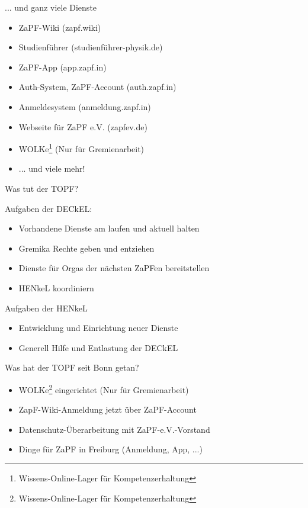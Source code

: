 \documentclass[compress, aspectratio=169]{beamer}
\begin{document}
\thispagestyle{empty}
\begin{frame}{... und ganz viele Dienste}
  \begin{itemize}
    \item ZaPF-Wiki (zapf.wiki)
    \item Studienführer (studienführer-physik.de)
    \item ZaPF-App (app.zapf.in)
    \item Auth-System, \glqq{}ZaPF-Account\grqq{} (auth.zapf.in)
    \item Anmeldesystem (anmeldung.zapf.in)
    \item Webseite für ZaPF e.V. (zapfev.de)
    \item WOLKe\footnote{Wissens-Online-Lager für Kompetenzerhaltung} (Nur für Gremienarbeit)
    \item ... und viele mehr!
  \end{itemize}
\end{frame}

\pagestyle{empty}
\begin{frame}{Was tut der TOPF?}
\begin{block}{Aufgaben der DECkEL:}
\begin{itemize}
\item Vorhandene Dienste am laufen und aktuell halten
\item Gremika Rechte geben und entziehen
\item Dienste für Orgas der nächsten ZaPFen bereitstellen
\item HENkeL koordiniern
\end{itemize}
\end{block}
\pause
\begin{block}{Aufgaben der HENkeL}
  \begin{itemize}
    \item Entwicklung und Einrichtung neuer Dienste
    \item Generell Hilfe und Entlastung der DECkEL
  \end{itemize}
\end{block}
\end{frame}

\pagestyle{empty}
\begin{frame}{Was hat der TOPF seit Bonn getan?}
  \begin{itemize}
    \item WOLKe\footnote{Wissens-Online-Lager für Kompetenzerhaltung} eingerichtet (Nur für Gremienarbeit)
    \item ZapF-Wiki-Anmeldung jetzt über ZaPF-Account
    \item Datenschutz-Überarbeitung mit ZaPF-e.V.-Vorstand
    \item Dinge für ZaPF in Freiburg (Anmeldung, App, ...)
  \end{itemize}
\end{frame}
\end{document}

